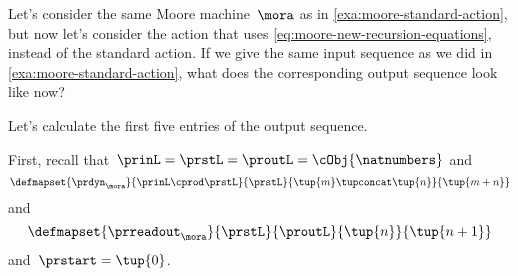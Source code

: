 \begin{example}
    \label{exa:moore-non-standard-action-on-sequences}
    Let's consider the same Moore machine~$\mora$ as in \cref{exa:moore-standard-action}, but now let's consider the action that uses \cref{eq:moore-new-recursion-equations}, instead of the standard action.
    If we give the same input sequence as we did in \cref{exa:moore-standard-action}, what does the corresponding output sequence look like now?

    Let's calculate the first five entries of the output sequence.

    First, recall that~$\prinL = \prstL = \proutL = \cObj{\natnumbers}$
    and
    \begin{equation*}
        \defmapset{
            \prdyn_\mora
        }{
            \prinL \cprod \prstL
        }{
            \prstL
        }{
            \tup{m} \tupconcat \tup{n}
        }{
            \tup{m + n}
        }
    \end{equation*}
    and
    \begin{equation*}
        \defmapset{
            \prreadout_\mora
        }{
            \prstL
        }{
            \proutL
        }{
            \tup{n}
        }{
            \tup{n+1}
        }
    \end{equation*}
    and~$\prstart = \tup{0}$.


\end{example}
